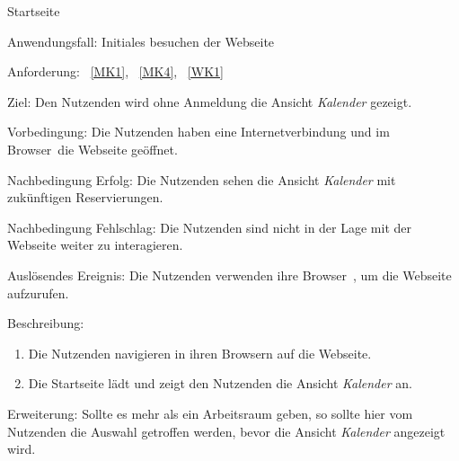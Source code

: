 \begin{function}{10}{Startseite}
    \item[Anwendungsfall:] Initiales besuchen der Webseite
    \item[Anforderung:]~\ref{MK1}, ~\ref{MK4}, ~\ref{WK1}
    \item[Ziel:] Den Nutzenden wird ohne Anmeldung die Ansicht \textit{Kalender} gezeigt.
    \item[Vorbedingung:] Die Nutzenden haben eine Internetverbindung und im \gls{Browser}~die Webseite geöffnet.
    \item[Nachbedingung Erfolg:] Die Nutzenden sehen die Ansicht \textit{Kalender} mit zukünftigen Reservierungen.
    \item[Nachbedingung Fehlschlag:] Die Nutzenden sind nicht in der Lage mit der Webseite weiter zu interagieren.
    \item[Auslösendes Ereignis:] Die Nutzenden verwenden ihre \gls{Browser}~, um die Webseite aufzurufen.
    \item[Beschreibung:]~
    \begin{enumerate}
        \item Die Nutzenden navigieren in ihren Browsern auf die Webseite.
        \item Die Startseite lädt und zeigt den Nutzenden die Ansicht \textit{Kalender} an.
    \end{enumerate}
    \item[Erweiterung:] Sollte es mehr als ein Arbeitsraum geben, so sollte hier vom Nutzenden die Auswahl getroffen werden, bevor die Ansicht \textit{Kalender} angezeigt wird.
\end{function}

\pagebreak

